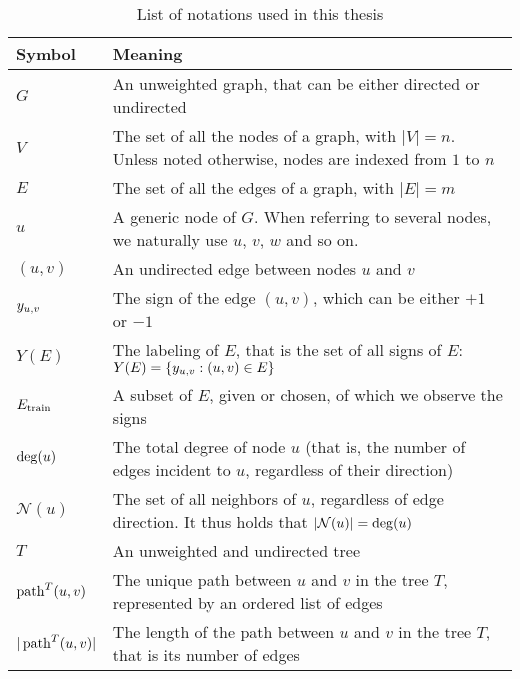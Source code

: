 \begin{table*}[thpb]
  \centering
  \caption{List of notations used in this thesis}\label{tab:notations}%
  \vspace{-.5\baselineskip}
  \begin{tabulary}{187mm}{LL}
    \toprule
    Symbol & Meaning \\
    \midrule
    $G$ & An unweighted graph, that can be either directed or undirected \\
    $V$ & The set of all the nodes of a graph, with $|V|=n$. Unless noted otherwise, nodes are indexed from $1$ to $n$ \\
    $E$ & The set of all the edges of a graph, with $|E|=m$ \\
    $u$ & A generic node of $G$. When referring to several nodes, we naturally use $u$, $v$, $w$ and so on. \\
    $(u,v)$ & An undirected edge between nodes $u$ and $v$ \\
    $y_{u, v}{}$ & The sign of the edge $(u,v)$, which can be either $+1$ or $-1$ \\
    $Y(E)$ & The labeling of $E$, that is the set of all signs of $E$: $Y(E) = \{y_{u, v} : (u,v)\in E\}$ \\
    $E_{\mathrm{train}}$ & A subset of $E$, given or chosen, of which we observe the signs \\
    $\operatorname{deg}(u)$ & The total degree of node $u$ (that is, the number of edges incident to $u$,
    regardless of their direction) \\
    $\mathcal{N}(u)$ & The set of all neighbors of $u$, regardless of edge direction. It thus holds
    that $|\mathcal{N}(u)| = \operatorname{deg}(u)$ \\
    $T$ & An unweighted and undirected tree \\
    $\operatorname{path}^T(u, v)$ & The unique path between $u$ and $v$ in the tree $T$, represented by an ordered list of edges \\
    $|\operatorname{path}^T(u, v)|$ & The length of the path between $u$ and $v$ in the tree $T$, that is its number of edges \\
    \bottomrule
  \end{tabulary}
\end{table*}
